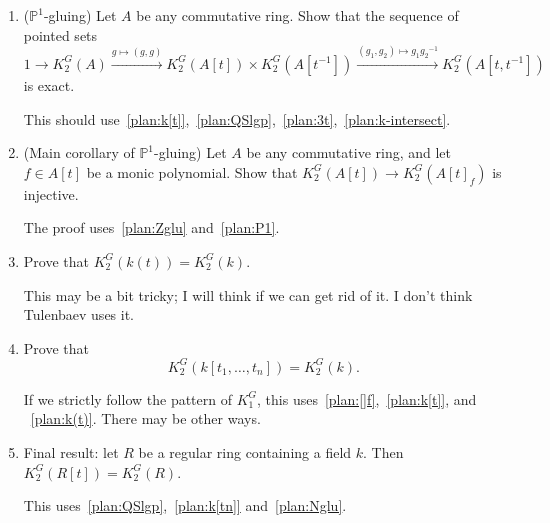 \documentclass[oneside,12pt]{amsart}
\numberwithin{equation}{section}
\numberwithin{lem}{section}
\theoremstyle{definition}
\theoremstyle{remark}
\DeclareMathOperator{\St}{St^G}
\newcommand{\Pro}{\mathbb{P}}
\newcommand{\st}{\scriptstyle}
\begin{document}
\begin{enumerate}
(i) If $Ah+B=A$, i.e. the natural map $B\to A/Ah$ is surjective, then for any $x\in \St(A_h)$ there exist
$y\in \St(A)$ and $z\in \St(B_h)$ such that
$x=F_h(y)z$.

(ii) If moreover $Ah\cap B=Bh$, i.e. $B/Bh\to A/Ah$ is an isomorphism, and $h$ is not a zero divisor in $A$, then
the sequence of pointed sets
$$
K_2^G(B)\xrightarrow{\st g\mapsto (F_h(g),g)} K_2^G(B_h)\times K_2^G(A)\xrightarrow{\st (g_1,g_2)\mapsto g_1F_h(g_2)^{-1}}
K_2^G(A_h)
$$
is exact.

This should use something from the proof of~\eqref{plan:QSlgp} or~\eqref{plan:Zglu}; see~\cite[Lemma 3.4]{St-poly}.

\item\label{plan:P1} ($\Pro^1$-gluing) Let $A$ be any commutative ring. Show that the sequence of pointed sets
$$
1\longrightarrow K_2^G(A)\xrightarrow{\st g\mapsto (g,g)} K_2^G(A[t])\times K_2^G(A[t^{-1}])
\xrightarrow{\st (g_1,g_2)\mapsto g_1{g_2}^{-1}} K_2^G(A[t,t^{-1}])
$$
is exact.

This should use~\eqref{plan:k[t]},~\eqref{plan:QSlgp},~\eqref{plan:3t},~\eqref{plan:k-intersect}.

\item\label{plan:[]f} (Main corollary of $\Pro^1$-gluing) Let $A$ be any commutative ring, and let $f\in A[t]$ be a monic polynomial. Show that
$K_2^G(A[t])\to K_2^G(A[t]_f)$ is injective.

The proof uses~\eqref{plan:Zglu} and~\eqref{plan:P1}.

\item\label{plan:k(t)} Prove that $K_2^G(k(t))=K_2^G(k)$.

This may be a bit tricky; I will think if we can get rid of it. I don't think Tulenbaev uses it.

\item\label{plan:k[tn]} Prove that
$$K_2^G(k[t_1,\ldots,t_n])=K_2^G(k).$$

If we strictly follow the pattern of $K_1^G$, this uses~\eqref{plan:[]f},~\eqref{plan:k[t]}, and
~\eqref{plan:k(t)}. There may be other ways.

\item \label{plan:final} Final result: let $R$ be a regular ring containing a field $k$. Then $K_2^G(R[t])=K_2^G(R)$.

This uses~\eqref{plan:QSlgp},~\eqref{plan:k[tn]} and~\eqref{plan:Nglu}.
\end{enumerate}

\end{document}
